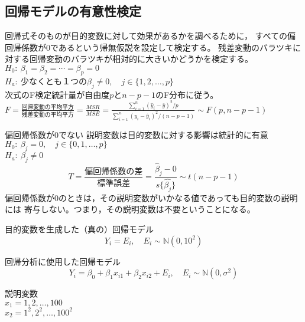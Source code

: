 
\subsection{回帰モデルの有意性検定}

{
  回帰式そのものが目的変数に対して効果があるかを調べるために，
  すべての偏回帰係数が0であるという帰無仮説を設定して検定する。
  残差変動のバラツキに対する回帰変動のバラツキが相対的に大きいかどうかを検定する。\\
  $H_0:~\beta_1 = \beta_2 = \cdots = \beta_p = 0$\\
  $H_a:~$少なくとも１つの$\beta_j \ne 0, \quad j \in \{1,2,\dots,p\}$\\
  次式のF検定統計量が自由度$p$と$n-p-1$のF分布に従う。\\
  $F=\frac{回帰変動の平均平方}{残差変動の平均平方} 
    =\frac{MSR}{MSE}
    =\frac{\sum_{i=1}^n(\hat{y}_i-\bar{y})^2/p}{\sum_{i=1}^n(y_i-\hat{y}_i)^2/(n-p-1)}\sim F(p, n-p-1)$\\
}

{
  偏回帰係数が0でない \Ra 説明変数は目的変数に対する影響は統計的に有意\\
  $H_0:~\beta_j = 0, \quad j \in \{0,1,\dots,p\}$\\
  $H_a:~\beta_j \ne 0$\\
  \[T=\frac{偏回帰係数の差}{標準誤差}=\frac{\hat{\beta}_j - 0}{s\{\hat{\beta_j}\}}\sim t(n-p-1)\]
  偏回帰係数が0のときは，その説明変数がいかなる値であっても目的変数の説明には
  寄与しない。つまり，その説明変数は不要ということになる。
}

{
  \small
  
}

{
  目的変数を生成した（真の）回帰モデル
  \blue
  {
    \[Y_i= E_i, \quad E_i\sim \mathbb{N}(0, 10^2)\]
  }

  回帰分析に使用した回帰モデル
  \[Y_i=\beta_0+\beta_1 x_{i1}+\beta_2 x_{i2}+E_i,\quad E_i\sim \mathbb{N}(0,\sigma^2)\]

  説明変数\\
  $x_1 = 1, 2, \dots, 100$\\
  $x_2 = 1^2, 2^2, \dots, 100^2$
}

{
  \small
  
}

